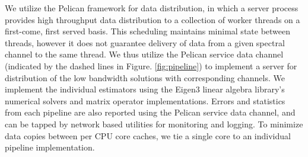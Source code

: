 \documentclass{aa}
\begin{document}
We   utilize   the  Pelican   \citep{salvini2011pelican}   framework  for   data
distribution,  in   which  a  server  process  provides   high  throughput  data
distribution to  a collection  of worker threads  on a first-come,  first served
basis. This scheduling maintains minimal  state between threads, however it does
not  guarantee delivery  of  data from  a  given spectral  channel  to the  same
thread.  We thus  utilize the  Pelican service  data channel  (indicated  by the
dashed  lines  in  Figure.    \ref{fig:pipeline})  to  implement  a  server  for
distribution  of the  low bandwidth  solutions with  corresponding  channels. We
implement  the individual  estimators using  the Eigen3  \citep{eigenweb} linear
algebra library's numerical solvers and matrix operator implementations.  Errors
and statistics  from each pipeline are  also reported using  the Pelican service
data channel,  and can be tapped  by network based utilities  for monitoring and
logging. To  minimize data copies between per  CPU core caches, we  tie a single
core to an individual pipeline implementation.


\end{document}
